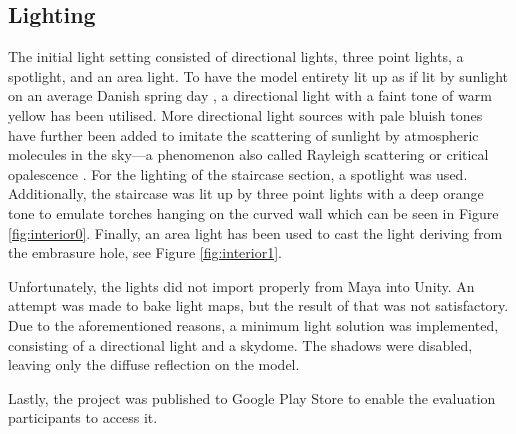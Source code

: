 \subsection{Lighting}
The initial light setting consisted of directional lights, three point lights, a spotlight, and an area light. To have the model entirety lit up as if lit by sunlight on an average Danish spring day \cite{DMI}, a directional light with a faint tone of warm yellow has been utilised. More directional light sources with pale bluish tones have further been added to imitate the scattering of sunlight by atmospheric molecules in the sky---a phenomenon also called Rayleigh scattering or critical opalescence \cite{DOE} \cite{Renn2005}. For the lighting of the staircase section, a spotlight was used. Additionally, the staircase was lit up by three point lights with a deep orange tone to emulate torches hanging on the curved wall which can be seen in Figure \ref{fig:interior0}. Finally, an area light has been used to cast the light deriving from the embrasure hole, see Figure \ref{fig:interior1}.

Unfortunately, the lights did not import properly from Maya into Unity. An attempt was made to bake light maps, but the result of that was not satisfactory. Due to the aforementioned reasons, a minimum light solution was implemented, consisting of a directional light and a skydome. The shadows were disabled, leaving only the diffuse reflection on the model.

Lastly, the project was published to Google Play Store to enable the evaluation participants to access it.

